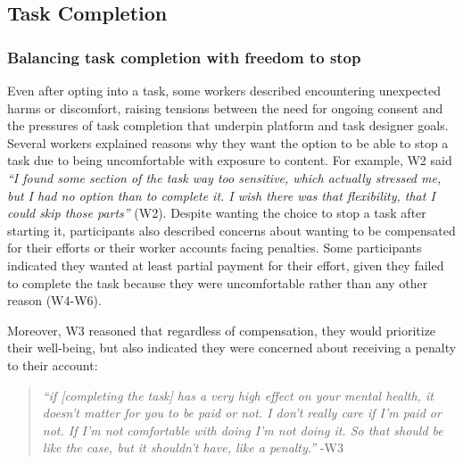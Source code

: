\subsection{Task Completion}

\subsubsection{Balancing task completion with freedom to stop}
Even after opting into a task, some workers described encountering unexpected harms or discomfort, raising tensions between the need for ongoing consent and the pressures of task completion that underpin platform and task designer goals.
Several workers explained reasons why they want the option to be able to stop a task due to being uncomfortable with exposure to content. For example, W2 said \textit{``I found some section of the task way too sensitive, which actually stressed me, but I had no option than to complete it. I wish there was that flexibility, that I could skip those parts''} (W2). Despite wanting the choice to stop a task after starting it, participants also described concerns about wanting to be compensated for their efforts or their worker accounts facing penalties. Some participants indicated they wanted at least partial payment for their effort, given they failed to complete the task because they were uncomfortable rather than any other reason (W4-W6). 

Moreover, W3 reasoned that regardless of compensation, they would prioritize their well-being, but also indicated they were concerned about receiving a penalty to their account:
\begin{quote}
    \textit{``if [completing the task] has a very high effect on your mental health, it doesn't matter for you to be paid or not. I don't really care if I'm paid or not. If I'm not comfortable with doing I'm not doing it. So that should be like the case, but it shouldn't have, like a penalty.''} -W3
\end{quote}


